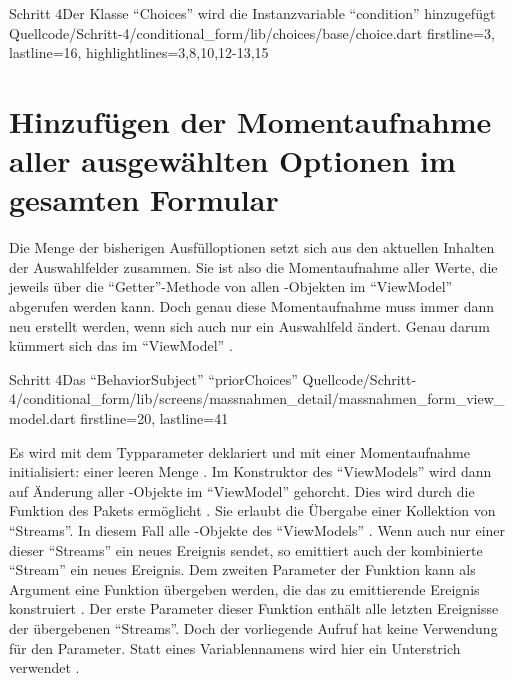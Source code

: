 \begin{alexlisting}{Schritt 4}{Der Klasse \enquote{Choices} wird die Instanzvariable \enquote{condition} hinzugefügt}
  {Quellcode/Schritt-4/conditional_form/lib/choices/base/choice.dart}
  {firstline=3, lastline=16, highlightlines={3,8,10,12-13,15 }}
  \label{lst:Schritt4Choice}
\end{alexlisting}

\section{Hinzufügen der Momentaufnahme aller ausgewählten Optionen im gesamten Formular}

Die Menge der bisherigen Ausfülloptionen setzt sich aus den aktuellen Inhalten der Auswahlfelder zusammen.
Sie ist also die Momentaufnahme aller Werte,
die jeweils über die \enquote{Getter}-Methode  von allen -Objekten im \enquote{ViewModel} abgerufen werden kann.
Doch genau diese Momentaufnahme muss immer dann neu erstellt werden,
wenn sich auch nur ein Auswahlfeld ändert.
Genau darum kümmert sich das   im \enquote{ViewModel} \Lst{\ref{lst:Schritt4priorChoices}}.

\begin{alexlisting}{Schritt 4}{Das \enquote{BehaviorSubject} \enquote{priorChoices}}
  {Quellcode/Schritt-4/conditional_form/lib/screens/massnahmen_detail/massnahmen_form_view_model.dart}
  {firstline=20, lastline=41}
  \label{lst:Schritt4priorChoices}
\end{alexlisting}

Es wird mit dem Typparameter  deklariert  und mit einer Momentaufnahme initialisiert: einer leeren Menge .
Im Konstruktor des \enquote{ViewModels} wird dann auf Änderung aller -Objekte im \enquote{ViewModel} gehorcht.
Dies wird durch die Funktion  des Pakets  ermöglicht .
Sie erlaubt die Übergabe einer Kollektion von \enquote{Streams}.
In diesem Fall alle -Objekte des \enquote{ViewModels} .
Wenn auch nur einer dieser \enquote{Streams} ein neues Ereignis sendet,
so emittiert auch der kombinierte \enquote{Stream} ein neues Ereignis.
Dem zweiten Parameter der Funktion  kann als Argument eine Funktion übergeben werden,
die das zu emittierende Ereignis konstruiert .
Der erste Parameter dieser Funktion enthält alle letzten Ereignisse der übergebenen \enquote{Streams}.
Doch der vorliegende Aufruf hat keine Verwendung für den Parameter.
Statt eines Variablennamens wird hier ein Unterstrich \IC{_} verwendet .

